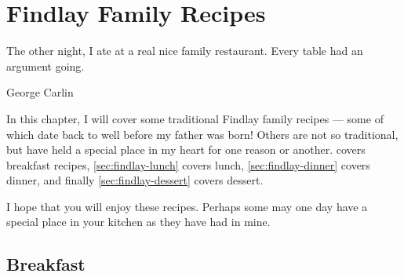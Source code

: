 \chapter{Findlay Family Recipes}
\label{chap:findlay-recipes}

\epigraph{
The other night, I ate at a real nice family restaurant.
Every table had an argument going.
}{George Carlin}

\noindent
In this chapter, I will cover some traditional Findlay family recipes --- some
of which date back to well before my father was born! Others are not so traditional,
but have held a special place in my heart for one reason or another. 
covers breakfast recipes, \cref{sec:findlay-lunch} covers lunch, \cref{sec:findlay-dinner}
covers dinner, and finally \cref{sec:findlay-dessert} covers dessert.

I hope that you will enjoy these recipes. Perhaps some may one day have
a special place in your kitchen as they have had in mine.

\section{Breakfast}
\label{sec:findlay-breakfast}

